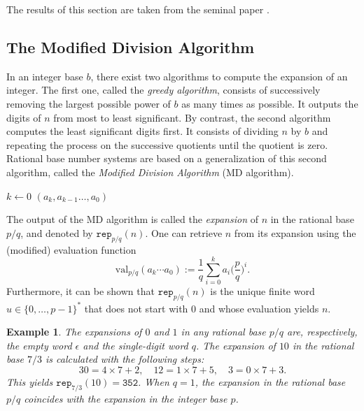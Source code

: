 \documentclass{template_arxiv}
\newtheorem{example}[theorem]{Example}
\numberwithin{equation}{section}
\newcommand{\eps}{\epsilon}
\newcommand{\val}{\mathrm{val}}
\newcommand{\rep}{\mathtt{rep}}
\begin{document}
The results of this section are taken from the seminal paper \cite{AFS08}.

\subsection{The Modified Division Algorithm}

In an integer base $b$, there exist two algorithms to compute the expansion of an integer. The first one, called the \emph{greedy algorithm}, consists of successively removing the largest possible power of $b$ as many times as possible. It outputs the digits of 
$n$ from most to least significant.
By contrast, the second algorithm computes the least significant digits first. It consists of dividing $n$ by $b$ and repeating the process on the successive quotients until the quotient is zero. 
Rational base number systems are based on a generalization of this second algorithm, called the \emph{Modified Division Algorithm} (MD algorithm).


\begin{algorithm}
	\caption{Modified Division Algorithm}
	
	$k \leftarrow 0$\;   
	\Return $(a_k, a_{k-1}\dots,a_0)$\;	
\end{algorithm}


The output of the MD algorithm is called the \emph{expansion} of $n$ in the rational base $p/q$, and denoted by $\rep_{p/q}(n)$. 
 One can retrieve $n$ from its expansion using the (modified) evaluation function
\begin{equation}\label{eq:def_val}
\val_{p/q}(a_k\cdots a_0):=\frac{1}{q}\sum_{i=0}^k a_i \Big(\frac{p}{q}\Big)^i.
\end{equation}
Furthermore, it can be shown that $\rep_{p/q}(n)$ is the unique finite word $u \in \{0, \dots, p-1\}^*$ that does not start with $0$ and whose evaluation yields $n$.

\medskip



\begin{example}\label{ex:MD_algo} The expansions of $0$ and $1$ in any rational base $p/q$ are, respectively, the empty word $\eps$ and the single-digit word $q$. The expansion of $10$ in the rational base $7/3$ is calculated with the following steps:
\[
 30 = 4 \times 7 + 2, \quad
12 = 1 \times 7 + 5, \quad
3 = 0 \times 7 + 3.
\]
This yields $\rep_{7/3}(10) = \mathtt{352}$. When $q=1$, the expansion in the rational base $p/q$ coincides with the expansion in the integer base $p$.
\end{example}
\end{document}
